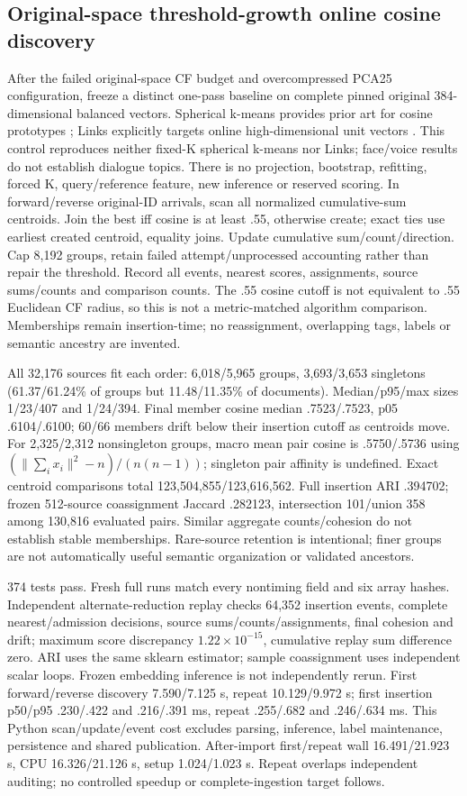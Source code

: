\documentclass[11pt]{article}
\begin{document}
\subsection{Original-space threshold-growth online cosine discovery}
After the failed original-space CF budget and overcompressed PCA25 configuration,
freeze a distinct one-pass baseline on complete pinned original 384-dimensional
balanced vectors. Spherical k-means provides prior art for cosine prototypes
\cite{hornik2012spherical}; Links explicitly targets online high-dimensional unit
vectors \cite{mansfield2018links}. This control reproduces neither fixed-K
spherical k-means nor Links; face/voice results do not establish dialogue topics.
There is no projection, bootstrap, refitting, forced K, query/reference feature,
new inference or reserved scoring. In forward/reverse original-ID arrivals,
scan all normalized cumulative-sum centroids. Join the best iff cosine is at
least .55, otherwise create; exact ties use earliest created centroid, equality
joins. Update cumulative sum/count/direction. Cap 8,192 groups, retain failed
attempt/unprocessed accounting rather than repair the threshold. Record all
events, nearest scores, assignments, source sums/counts and comparison counts.
The .55 cosine cutoff is not equivalent to .55 Euclidean CF radius, so this is
not a metric-matched algorithm comparison. Memberships remain insertion-time;
no reassignment, overlapping tags, labels or semantic ancestry are invented.

All 32,176 sources fit each order: 6,018/5,965 groups, 3,693/3,653 singletons
(61.37/61.24\% of groups but 11.48/11.35\% of documents). Median/p95/max sizes
1/23/407 and 1/24/394. Final member cosine median .7523/.7523, p05 .6104/.6100;
60/66 members drift below their insertion cutoff as centroids move. For 2,325/2,312
nonsingleton groups, macro mean pair cosine is .5750/.5736 using
$(\|\sum_i x_i\|^2-n)/(n(n-1))$; singleton pair affinity is undefined.
Exact centroid comparisons total 123,504,855/123,616,562. Full insertion ARI
.394702; frozen 512-source coassignment Jaccard .282123, intersection 101/union
358 among 130,816 evaluated pairs. Similar aggregate counts/cohesion do not
establish stable memberships. Rare-source retention is intentional; finer groups
are not automatically useful semantic organization or validated ancestors.

374 tests pass. Fresh full runs match every nontiming field and six array hashes.
Independent alternate-reduction replay checks 64,352 insertion events, complete
nearest/admission decisions, source sums/counts/assignments, final cohesion and
drift; maximum score discrepancy $1.22\times10^{-15}$, cumulative replay sum
difference zero. ARI uses the same sklearn estimator; sample coassignment uses
independent scalar loops. Frozen embedding inference is not independently rerun.
First forward/reverse discovery 7.590/7.125 s, repeat 10.129/9.972 s;
first insertion p50/p95 .230/.422 and .216/.391 ms, repeat .255/.682 and
.246/.634 ms. This Python scan/update/event cost excludes parsing, inference,
label maintenance, persistence and shared publication. After-import first/repeat
wall 16.491/21.923 s, CPU 16.326/21.126 s, setup 1.024/1.023 s. Repeat overlaps
independent auditing; no controlled speedup or complete-ingestion target follows.
\end{document}
